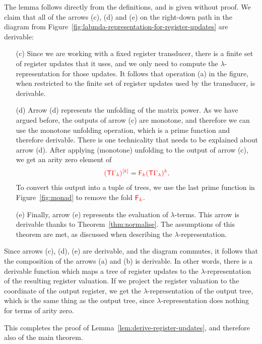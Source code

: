 The lemma follows  directly from the definitions, and is given without proof.  
We claim that all of the arrows (c), (d) and (e) on the  right-down path  in the diagram from Figure~\ref{fig:labmda-representation-for-register-updates}   are derivable:
\begin{itemize}
    \item[(c)] Since we are working with a fixed register transducer, there is a finite set of register updates that it uses, and we only need to compute the $\lambda$-representation for those updates. It follows that operation (a) in the figure, when restricted to the finite set of register updates used by the transducer, is derivable.
    \item[(d)] Arrow (d) represents the unfolding of the matrix power. As we have argued before, the outputs of arrow (c) are monotone, and therefore we can use the monotone unfolding operation, which is a  prime function and therefore derivable. There is one technicality that needs to be explained about arrow (d). After applying (monotone) unfolding to the output of arrow (c), we get an  arity zero element of 
    \begin{align*}
        \ranked{
            \mati k {(\tmonad \rGamma_\lambda)}} = \reduce  k {\powersmall{(\tmonad \rGamma_\lambda)}{k}}.
    \end{align*}
    To convert this output into a tuple of trees, we use the last prime function in Figure~\ref{fig:monad} to remove the fold $\reduce k$.
    \item[(e)] Finally, arrow (e) represents the evaluation of $\lambda$-terms. This arrow is derivable thanks to Theorem~\ref{thm:normalise}. The assumptions of this theorem are met, as discussed when describing the $\lambda$-representation.
\end{itemize}
Since arrows (c), (d), (e) are derivable, and the diagram commutes, it follows that  the composition of the arrows (a) and (b) is derivable. In other words, there is a derivable function which maps a tree of register updates to the $\lambda$-representation of the resulting register valuation. If we project the register valuation to the coordinate of the output register, we get the $\lambda$-representation of the output tree, which is the same thing as the output tree, since $\lambda$-representation does nothing for terms of arity zero. 

This completes the proof of Lemma~\ref{lem:derive-register-updates}, and therefore also of the main theorem. 





